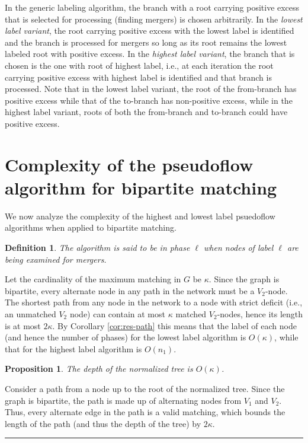 \documentclass{article}
\newtheorem{proposition}{Proposition}[section]
\newtheorem{definition}{Definition}[section]
\newenvironment{proof}[1][Proof:]{\begin{trivlist}
\item[\hskip \labelsep {\bfseries #1}]}{\end{trivlist}}
\newcommand{\qed}{\hfill \rule{2.5mm}{2.5mm}}
\begin{document}
In the generic labeling algorithm, the branch with a root carrying positive excess that is selected for processing (finding mergers) is chosen arbitrarily. In the {\em lowest label variant}, the root carrying positive excess with the lowest label is identified and the branch is processed for mergers so long as its root remains the lowest labeled root with positive excess.  In the {\em highest label variant}, the branch that is chosen is the one with root of highest label, i.e., at each iteration the root carrying positive excess with highest label is identified and that branch is processed.  Note that in the lowest label variant, the root of the from-branch has positive excess while that of the to-branch has non-positive excess, while in the highest label variant, roots of both the from-branch and to-branch could have positive excess.

\section{Complexity of the pseudoflow algorithm for bipartite matching}
\label{section:bipcomplexity}

We now analyze the complexity of the highest and lowest label psuedoflow algorithms when applied to bipartite matching.

\begin{definition}
The algorithm is said to be in {\em phase $\ell$} when nodes of label $\ell$ are being examined for mergers.
\end{definition}

Let the cardinality of the maximum matching in $G$ be $\kappa$.  Since the graph is bipartite, every alternate node in any path in the network must be a $V_2$-node.  The shortest path from any node in the network to a node with strict deficit (i.e., an unmatched $V_2$ node) can contain at most $\kappa$ matched $V_2$-nodes, hence its length is at most $2 \kappa$.  By Corollary \ref{cor:res-path} this means that the label of each node (and hence the number of phases) for the lowest label algorithm is $O(\kappa)$, while that for the highest label algorithm is $O(n_1)$.

\begin{proposition}
The depth of the normalized tree is $O(\kappa)$.
\end{proposition}
\begin{proof}
Consider a path from a node up to the root of the normalized tree.  Since the graph is bipartite, the path is made up of alternating nodes from $V_1$ and $V_2$.  Thus, every alternate edge in the path is a valid matching, which bounds the length of the path (and thus the depth of the tree) by $2 \kappa$.\qed
\end{proof}
\end{document}
